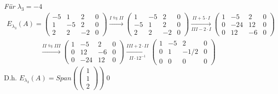 \documentclass[titlepage]{article}
\newcommand{\1}{\mathbb{1}}
\newcommand{\0}{\mathbb{0}}
\newcommand{\vecD}[3]{\left(\begin{smallmatrix}#1\\#2\\#3\end{smallmatrix}\right)}
\begin{document}
			\textit{Für $\lambda_3=-4$}
			\begin{align*}
				E_{\lambda_3}(A)=
				\begin{pmatrix}
					-5&1&2&0\\
					1&-5&2&0\\
					2&2&-2&0
				\end{pmatrix}
				\xrightarrow[]{I\leftrightarrows II}
				\begin{pmatrix}
					1&-5&2&0\\
					-5&1&2&0\\
					2&2&-2&0
				\end{pmatrix}
				\xrightarrow[III-2\cdot I]{II+5\cdot I}
				\begin{pmatrix}
					1&-5&2&0\\
					0&-24&12&0\\
					0&12&-6&0
				\end{pmatrix}
			\end{align*}
			\begin{align*}
				\xrightarrow[]{II\leftrightarrows III}
				\begin{pmatrix}
					1&-5&2&0\\
					0&12&-6&0\\
					0&-24&12&0
				\end{pmatrix}
				\xrightarrow[II\cdot12^{-1}]{III+2\cdot II}
				\begin{pmatrix}
					1&-5&2&0\\
					0&1&-1/2&0\\
					0&0&0&0
				\end{pmatrix}
			\end{align*}
			\indent
			D.h. $E_{\lambda_3}(A)=Span(\vecD{1}{1}{2})$\qed
		
\end{document}
